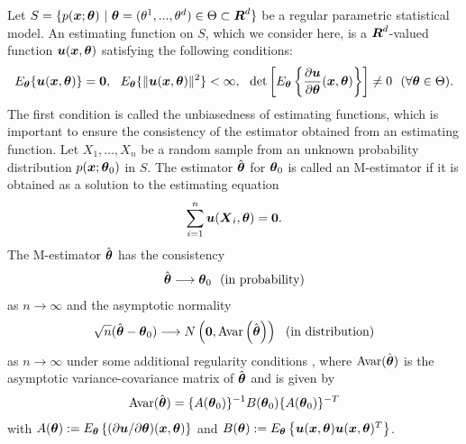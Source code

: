 \documentclass[graybox]{svmult}
\newcommand{\bm}[1]{\mbox{\boldmath $#1$}}
\newcommand{\bms}[1]{\mbox{\scriptsize\boldmath $#1$}}
\begin{document}
Let $S=\{p(\bm{x};\bm{\theta}) \ | \ \bm{\theta}=(\theta^1,...,\theta^d) \in \Theta \subset
\bm{R}^d\}$ be a regular parametric statistical model.
An estimating function on $S$, which we consider here, is a $\bm{R}^{d}$-valued function
$\bm{u}(\bm{x},\bm{\theta})$ satisfying the following conditions:
%
\begin{eqnarray*}
   E_{\bms{\theta}}\{\bm{u}(\bm{x},\bm{\theta})\} = \bm{0}, \ \
   E_{\bms{\theta}}\{\|\bm{u}(\bm{x},\bm{\theta})\|^2\} < \infty, \ \
   \det\left[E_{\bms{\theta}}\left\{\frac{\partial\bm{u}}{\partial\bm{\theta}}
   (\bm{x},\bm{\theta})\right\}\right] \neq 0 \ \
   (\forall\bm{\theta} \in \Theta).
\end{eqnarray*}
%
The first condition is called the unbiasedness of estimating functions, which is important
to ensure the consistency of the estimator obtained from an estimating function.
Let $X_1,\ldots,X_n$ be a random sample from an unknown probability distribution
$p(\bm{x};\bm{\theta}_0)$ in $S$. The estimator $\hat{\bm{\theta}}$ for $\bm{\theta}_0$
is called an M-estimator if it is obtained as a solution to the estimating equation
%
\begin{eqnarray}\label{esteq}
   \sum_{i=1}^{n}\bm{u}(\bm{X}_i,\bm{\theta}) = \bm{0}.
\end{eqnarray}
%
The M-estimator $\hat{\bm{\theta}}$ has the consistency
%
\begin{eqnarray*}
   \hat{\bm{\theta}} \longrightarrow \bm{\theta}_0 \ \ (\mbox{in probability})
\end{eqnarray*}
%
as $n \rightarrow \infty$ and the asymptotic normality
%
\begin{eqnarray*}
   \sqrt{n}(\hat{\bm{\theta}} - \bm{\theta}_0) \longrightarrow
   N\left(\bm{0},{\rm Avar}\left(\hat{\bm{\theta}}\right)\right) \ \ (\mbox{in distribution})
\end{eqnarray*}
%
as $n \rightarrow \infty$ under some additional regularity conditions \cite{V}, where
${\rm Avar}(\hat{\bm{\theta}})$ is the asymptotic variance-covariance matrix of
$\hat{\bm{\theta}}$ and is given by
%
\begin{eqnarray}\label{avar}
   {\rm Avar}(\hat{\bm{\theta}}) = \{A(\bm{\theta}_0)\}^{-1}B(\bm{\theta}_0)
                                   \{A(\bm{\theta}_0)\}^{-T} \label{avar}
\end{eqnarray}
%
with $A(\bm{\theta}):=E_{\bms{\theta}}\left\{(\partial\bm{u}/\partial\bm{\theta})(\bm{x},\bm{\theta})\right\}$
and $B(\bm{\theta}):=E_{\bms{\theta}}\left\{\bm{u}(\bm{x},\bm{\theta})\bm{u}(\bm{x},\bm{\theta})^T\right\}$.
\end{document}
